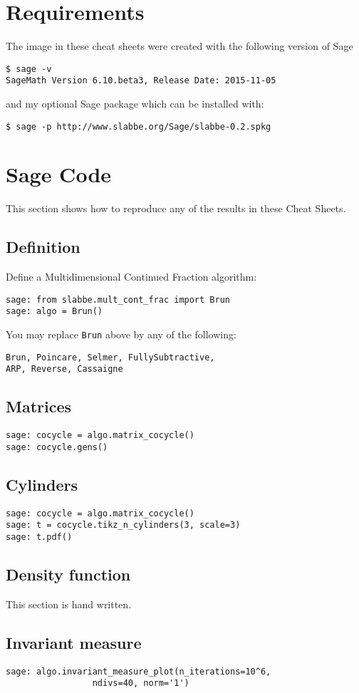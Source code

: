 \section{Requirements}
The image in these cheat sheets were created with the 
following version of Sage \cite{sage}
\begin{verbatim}
$ sage -v
SageMath Version 6.10.beta3, Release Date: 2015-11-05
\end{verbatim}
and my optional Sage package which can be installed with:
\begin{verbatim}
$ sage -p http://www.slabbe.org/Sage/slabbe-0.2.spkg
\end{verbatim}
\section{Sage Code}
This section shows how to reproduce any of the results in these Cheat Sheets.
\subsection{Definition}
Define a Multidimensional Continued Fraction algorithm:
\begin{verbatim}
sage: from slabbe.mult_cont_frac import Brun
sage: algo = Brun()
\end{verbatim}
You may replace \texttt{Brun} above by any of the following:
\begin{verbatim}
Brun, Poincare, Selmer, FullySubtractive, 
ARP, Reverse, Cassaigne
\end{verbatim}
\subsection{Matrices}
\begin{verbatim}
sage: cocycle = algo.matrix_cocycle()
sage: cocycle.gens()
\end{verbatim}
\subsection{Cylinders}
\begin{verbatim}
sage: cocycle = algo.matrix_cocycle()
sage: t = cocycle.tikz_n_cylinders(3, scale=3)
sage: t.pdf()
\end{verbatim}
\subsection{Density function}
This section is hand written.
\subsection{Invariant measure}
\begin{verbatim}
sage: algo.invariant_measure_plot(n_iterations=10^6,
                 ndivs=40, norm='1')
\end{verbatim}
